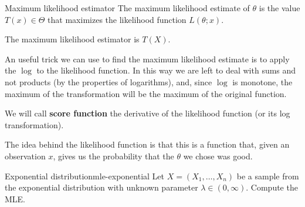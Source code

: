 \documentclass[12pt]{extarticle}
\begin{document}
\begin{definition}{Maximum likelihood estimator}{}
    The maximum likelihood estimate of $\theta$ is the value $T(x) \in \Theta$ that maximizes the likelihood function $L(\theta; x)$.

    The maximum likelihood estimator is $T(X)$.
\end{definition}

An useful trick we can use to find the maximum likelihood estimate is to apply the $\log$ to the likelihood function.
In this way we are left to deal with sums and not products (by the properties of logarithms), and, since $\log$ is monotone, the maximum of the transformation will be the maximum of the original function.

We will call \textbf{score function} the derivative of the likelihood function (or its log transformation).

The idea behind the likelihood function is that this is a function that, given an observation $x$, gives us the probability that the $\theta$ we chose was good.

\begin{example}{Exponential distribution}{mle-exponential}
    Let $X = (X_1, \dots, X_n)$ be a sample from the exponential distribution with unknown parameter $\lambda \in (0, \infty)$.
    Compute the MLE.
\end{example}
\end{document}
